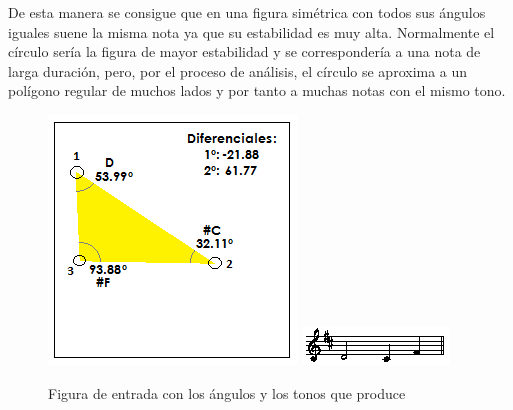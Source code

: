 De esta manera se consigue que en una figura simétrica con todos sus ángulos iguales suene la misma nota ya que su estabilidad es muy alta. Normalmente el círculo sería la figura de mayor estabilidad y se correspondería a una nota de larga duración, pero, por el proceso de análisis, el círculo se aproxima a un polígono regular de muchos lados y por tanto a muchas notas con el mismo tono.

		\begin{figure}[htbp]
		\centering
		\hspace*{0.0in}
		\includegraphics[scale=1.0]{graphics/simpletest1-F3.png}
		\includegraphics[scale=1.0]{graphics/simpletest1-MELpartitura.png}
		\caption{Figura de entrada con los ángulos y los tonos que produce}
		\label{fig:Figura4Voz1}
		\end{figure}

